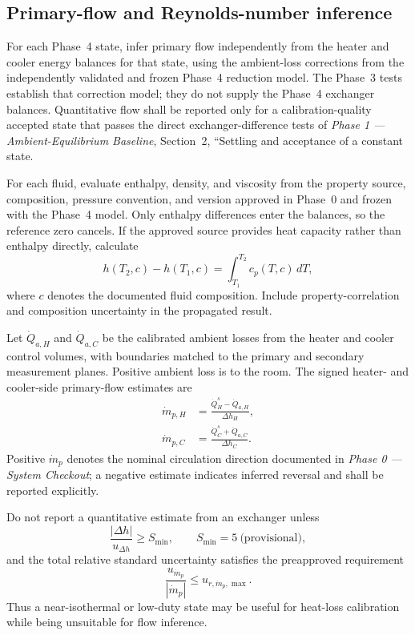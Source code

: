 \documentclass[11pt]{article}
\newcommand{\QHs}{\dot Q_{H}^{s}}
\newcommand{\QCs}{\dot Q_{C}^{s}}
\newcommand{\mdotp}{\dot m_{p}}
\newcommand{\mdotpH}{\dot m_{p,H}}
\newcommand{\mdotpC}{\dot m_{p,C}}
\newcommand{\PhaseZeroDoc}{\textit{Phase 0 --- System Checkout}}
\newcommand{\PhaseOneDoc}{\textit{Phase 1 --- Ambient-Equilibrium Baseline}}
\begin{document}
\subsection{Primary-flow and Reynolds-number inference}
\label{sec:flow_inference}

For each Phase~4 state, infer primary flow independently from the heater and cooler energy balances for that state, using the ambient-loss corrections from the independently validated and frozen Phase~4 reduction model. The Phase~3 tests establish that correction model; they do not supply the Phase~4 exchanger balances. Quantitative flow shall be reported only for a calibration-quality accepted state that passes the direct exchanger-difference tests of \PhaseOneDoc, Section~2, ``Settling and acceptance of a constant state.

For each fluid, evaluate enthalpy, density, and viscosity from the property source, composition, pressure convention, and version approved in Phase~0 and frozen with the Phase~4 model. Only enthalpy differences enter the balances, so the reference zero cancels. If the approved source provides heat capacity rather than enthalpy directly, calculate
\begin{equation}
    h(T_2,c)-h(T_1,c)
    =
    \int_{T_1}^{T_2}c_p(T,c)\,dT,
\end{equation}
where $c$ denotes the documented fluid composition. Include property-correlation and composition uncertainty in the propagated result.

Let $\dot Q_{a,H}$ and $\dot Q_{a,C}$ be the calibrated ambient losses from the heater and cooler control volumes, with boundaries matched to the primary and secondary measurement planes. Positive ambient loss is to the room. The signed heater- and cooler-side primary-flow estimates are
\begin{align}
    \mdotpH
    &=
    \frac{\QHs-\dot Q_{a,H}}
    {\Delta h_H},
    \label{eq:mdot_h}\\
    \mdotpC
    &=
    \frac{\QCs+\dot Q_{a,C}}
    {\Delta h_C}.
    \label{eq:mdot_c}
\end{align}
Positive $\mdotp$ denotes the nominal circulation direction documented in \PhaseZeroDoc; a negative estimate indicates inferred reversal and shall be reported explicitly.

Do not report a quantitative estimate from an exchanger unless
\begin{equation}
    \frac{|\Delta h|}{u_{\Delta h}}
    \geq
    S_{\min},
    \qquad
    S_{\min}=5\ \text{(provisional)},
    \label{eq:enthalpy_conditioning}
\end{equation}
and the total relative standard uncertainty satisfies the preapproved requirement
\begin{equation}
    \frac{u_{\mdotp}}{|\mdotp|}
    \leq
    u_{r,\mdotp,\max}.
    \label{eq:flow_uncertainty_limit}
\end{equation}
Thus a near-isothermal or low-duty state may be useful for heat-loss calibration while being unsuitable for flow inference.
\end{document}
